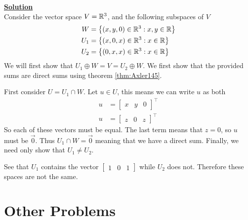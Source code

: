 \documentclass[answers]{exam}
\begin{document}
\begin{questions}
\begin{solution}
        \underline{\textbf{Solution}}\\
        Consider the vector space $V=\mathbb{R}^3$, and the following subspaces of $V$
        \begin{align*}
            W &= \left\{(x,y,0)\in\mathbb{R}^3 : x,y\in\mathbb{R}\right\}\\
            U_1 &= \left\{(x,0,x)\in\mathbb{R}^3 : x\in\mathbb{R}\right\}\\
            U_2 &= \left\{(0,x,x)\in\mathbb{R}^3 : x\in\mathbb{R}\right\}
        \end{align*}
        We will first show that $U_1\oplus W = V = U_2\oplus W$. We first show that the provided sums
        are direct sums using theorem \ref{thm:Axler145}.

        First consider $U=U_1\cap W$. Let $u\in U$, this means we can write $u$ as both
        \begin{align*}
            u &= \begin{bmatrix} x&y&0\end{bmatrix}^\top \\
            u &= \begin{bmatrix} z&0&z\end{bmatrix}^\top
        \end{align*}
        So each of these vectors must be equal. The last term means that $z = 0$, so $u$ must be $\vec{0}$.
        Thus $U_1\cap W = \vec{0}$ meaning that we have a direct sum. Finally, we need only show that 
        $U_1\neq U_2$.

        See that $U_1$ contains the vector $\begin{bmatrix}1&0&1\end{bmatrix}$ while $U_2$ does not. Therefore these spaces
        are not the same.
    \end{solution}
\end{questions}

\section{Other Problems}
\end{document}
